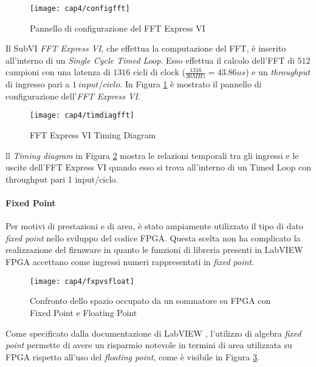\begin{figure}[H]  
  \begin{center}
    \texttt{[image: cap4/configfft]}
    \caption{Pannello di configurazione del FFT Express VI}
    \label{configfft}
  \end{center}
\end{figure}

Il SubVI \textit{FFT Express VI}, che effettua la computazione del FFT, è inserito all'interno di un \textit{Single Cycle Timed Loop}. Esso effettua il calcolo dell'FFT di $512$ campioni con una latenza di $1316$ cicli di clock ($\frac{1316}{30MHz}=43.86us$) e un \textit{throughput} di ingresso pari a $1\ input/ciclo$. In Figura \ref{configfft} è mostrato il pannello di configurazione dell'\textit{FFT Express VI}.

\begin{figure}[H]  
  \begin{center}
    \texttt{[image: cap4/timdiagfft]}
    \caption{FFT Express VI Timing Diagram}
    \label{timdiagfft}
  \end{center}
\end{figure}

ll \textit{Timing diagram} in Figura \ref{timdiagfft} mostra le relazioni temporali tra gli ingressi e le uscite dell'FFT Express VI quando esso si trova all'interno di un Timed Loop con throughput pari 1 input/ciclo.
	
\paragraph{Fixed Point}
Per motivi di prestazioni e di area, è stato ampiamente utilizzato il tipo di dato \textit{fixed point} nello sviluppo del codice FPGA. Questa scelta non ha complicato la realizzazione del firmware in quanto le funzioni di libreria presenti in LabVIEW FPGA accettano come ingressi numeri rappresentati in \textit{fixed point}.
\begin{figure}[H]  
  \begin{center}
    \texttt{[image: cap4/fxpvsfloat]}
    \caption{Confronto dello spazio occupato da un sommatore su FPGA con Fixed Point e Floating Point}
    \label{fxpvsfloat}
  \end{center}
\end{figure}

Come specificato dalla documentazione di LabVIEW \cite{fxpdoc}, l'utilizzo di algebra \textit{fixed point} permette di avere un risparmio notevole in termini di area utilizzata su FPGA rispetto all'uso del \textit{floating point}, come è visibile in Figura \ref{fxpvsfloat}.

